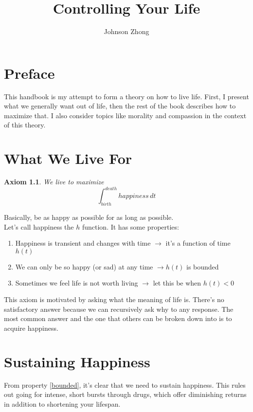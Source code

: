 \documentclass{report}
\newtheorem*{axiom}{Axiom}
\begin{document}
\title{Controlling Your Life}
\author{Johnson Zhong}

\maketitle

\chapter*{Preface}

This handbook is my attempt to form a theory on how to live life.
First, I present what we generally want out of life, then the rest of the book
describes how to maximize that. I also consider topics like morality
and compassion in the context of this theory.

\chapter{What We Live For}
\begin{axiom}
	We live to maximize $$\int_{birth}^{death} happiness \, dt$$
\end{axiom}

Basically, be as happy as possible for as long as possible.
\\

Let's call happiness the $h$ function. It has some properties:
\begin{enumerate}[label=H\arabic*]
	\item Happiness is transient and changes with time $\rightarrow$ it's
	a function of time $h(t)$
	\item \label{bounded} We can only be so happy (or sad) at any time $\rightarrow h(t)$ is bounded
	\item \label{positive} Sometimes we feel life is not worth living $\rightarrow$ let this be when $h(t) < 0$
\end{enumerate}  

This axiom is motivated by asking what the meaning of life is.
There's no satisfactory answer because we can recursively ask why to any response.
The most common answer and the one that others can be broken down into is to
acquire happiness.

\chapter{Sustaining Happiness}
From property \ref{bounded}, it's clear that we need to sustain happiness. 
This rules out going for intense, short bursts through drugs, 
which offer diminishing returns in addition to shortening your lifespan. 
\end{document}
